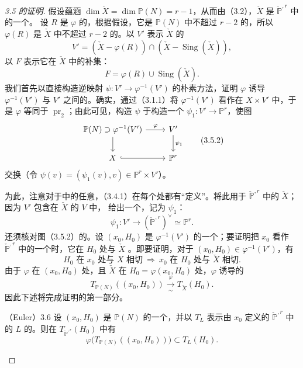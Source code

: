 \begin{proof}[3.5 的证明]
假设蕴涵 $\dim\check X=\dim\mathbb P(N)=r-1$，从而由（3.2），$\check X$ 是 $\check{\mathbb P}^{,r}$ 中的一个。
设 $R$ 是 $\varphi$ 的，根据假设，它是 $\mathbb P(N)$ 中不超过 $r-2$ 的，所以 $\varphi(R)$ 是 $\check X$ 中不超过 $r-2$ 的。以 $V'$ 表示 $\check X$ 的
\[
V'=(\check X-\varphi(R))\cap(\check X-\operatorname{Sing}(\check X)),\tag{3.5.1}
\]
以 $F$ 表示它在 $\check X$ 中的补集：
\[
F=\varphi(R)\cup\operatorname{Sing}(\check X).\tag{3.5.1.1}
\]
我们首先以直接构造逆映射 $\psi:V'\to\varphi^{-1}(V')$ 的朴素方法，证明 $\varphi$ 诱导 $\varphi^{-1}(V')$ 与 $V'$ 之间的。确实，通过（3.1.1）将 $\varphi^{-1}(V')$ 看作在 $X\times V'$ 中，于是 $\varphi$ 等同于 $\operatorname{pr}_2$；由此可见，构造 $\psi$ 于构造一个 $\psi_1:V'\to\mathbb P^r$，使图
\[
\begin{tikzcd}
\mathbb P(N)\supset\varphi^{-1}(V')\arrow[r,"\varphi"]\arrow[d]&V'\arrow[d,"\psi_1"]\\
X\arrow[r,hook]&\mathbb P^r
\end{tikzcd}\tag{3.5.2}
\]
交换（令 $\psi(v)=(\psi_1(v),v)\in\mathbb P^r\times V'$）。

为此，注意对于中的任意，（3.4.1）在每个处都有“定义”。将此用于 $\check{\mathbb P}^{,r}$ 中的 $\check X$；因为 $V'$ 包含在 $\check X$ 的 $V$ 中，
给出一个，记为 $\psi_1$：
\[
\psi_1:V'\longrightarrow(\check{\mathbb P}^{,r})^{\vee}\simeq\mathbb P^r.
\tag{3.5.3}
\]
还须核对图（3.5.2）的。设 $(x_0,H_0)$ 是 $\varphi^{-1}(V')$ 的一个；要证明把 $x_0$ 看作 $\check{\mathbb P}^{,r}$ 中的一个时，它在 $H_0$ 处与 $\check X$ 。即要证明，对于 $(x_0,H_0)\in\varphi^{-1}(V')$，有
\[
H_0\text{ 在 }x_0\text{ 处与 }X\text{ 相切}
\ \Longrightarrow\ x_0\text{ 在 }H_0\text{ 处与 }\check X\text{ 相切}.
\]
由于 $\varphi$ 在 $(x_0,H_0)$ 处，且 $\check X$ 在 $H_0=\varphi(x_0,H_0)$ 处，$\varphi$ 诱导的
\[
T_{\mathbb P(N)}((x_0,H_0))\xrightarrow[\sim]{\varphi}T_{\check X}(H_0).
\tag{3.5.4}
\]
因此下述将完成证明的第一部分。

\begin{SGAresult}{（Euler）}{3.6}
设 $(x_0,H_0)$ 是 $\mathbb P(N)$ 的一个，并以 $T_L$ 表示由 $x_0$ 定义的 $\check{\mathbb P}^{,r}$ 中的 $L$ 的。则在 $T_{\check{\mathbb P}^{,r}}(H_0)$ 中有
\[
\varphi\bigl(T_{\mathbb P(N)}((x_0,H_0))\bigr)\subset T_L(H_0).
\]
\end{SGAresult}
\end{proof}
